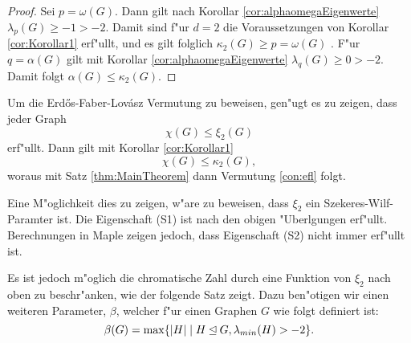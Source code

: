 \begin{proof}
  Sei $p = \omega(G)$. Dann gilt nach Korollar \ref{cor:alphaomegaEigenwerte} $\lambda_{p}\left( G \right)\geq -1 > -2$. Damit sind f"ur $d=2$ die Voraussetzungen von Korollar \ref{cor:Korollar1} erf"ullt, und es gilt folglich $\kappa_{2}\left( G \right)\geq p = \omega\left( G \right)$ .
  F"ur $q=\alpha\left( G \right)$ gilt mit Korollar \ref{cor:alphaomegaEigenwerte} $\lambda_{q}\left( G \right)\geq 0 > -2$. Damit folgt $\alpha\left( G \right) \leq \kappa_{2}\left( G \right)$.
\end{proof}

Um die Erd\H{o}s-Faber-Lov\'asz Vermutung zu beweisen, gen"ugt es zu zeigen, dass jeder Graph $$\chi(G) \leq \xi_{2}(G)$$ erf"ullt. Dann gilt mit Korollar \ref{cor:Korollar1} $$\chi(G) \leq \kappa_{2}(G),$$  woraus mit Satz \ref{thm:MainTheorem} dann Vermutung \ref{con:efl} folgt.

Eine M"oglichkeit dies zu zeigen, w"are zu beweisen, dass $\xi_2$ ein Szekeres-Wilf-Paramter ist. Die Eigenschaft (S1) ist nach den obigen "Uberlgungen erf"ullt. Berechnungen in Maple zeigen jedoch, dass Eigenschaft (S2) nicht immer erf"ullt ist. 

Es ist jedoch m"oglich die chromatische Zahl durch eine Funktion von $\xi_2$ nach oben zu beschr"anken, wie der folgende Satz zeigt. Dazu ben"otigen wir einen weiteren Parameter, $\beta$, welcher f"ur einen Graphen $G$ wie folgt definiert ist:
$$\beta(G) = \max\{|H| \;|\; H\unlhd G, \lambda_{min}(H) > -2 \}.$$

